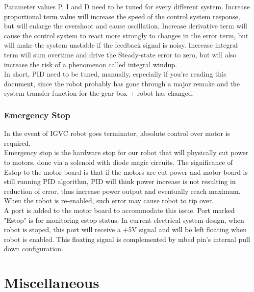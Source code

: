 \documentclass[letterpaper, 12pt]{article}
\begin{document}
Parameter values P, I and D need to be tuned for every different system. Increase proportional term value will increase the speed of the control system response, but will enlarge the overshoot and cause oscillation. Increase derivative term will cause the control system to react more strongly to changes in the error term, but will make the system unstable if the feedback signal is noisy. Increase integral term will sum overtime and drive the Steady-state error to zero, but will also increase the risk of a phenomenon called integral windup. \\

In short, PID need to be tuned, manually, especially if you're reading this document, since the robot probably has gone through a major remake and the system transfer function for the gear box + robot has changed.

\subsubsection{Emergency Stop}
In the event of IGVC robot goes terminator, absolute control over motor is required.\\

Emergency stop is the hardware stop for our robot that will physically cut power to motors, done via a solenoid with diode magic circuits. The significance of Estop to the motor board is that if the motors are cut power and motor board is still running PID algorithm, PID will think power increase is not resulting in reduction of error, thus increase power output and eventually reach maximum. When the robot is re-enabled, such error may cause robot to tip over. \\

A port is added to the motor board to accommodate this issue. Port marked "Estop" is for monitoring estop status. In current electrical system design, when robot is stoped, this port will receive a +5V signal and will be left floating when robot is enabled. This floating signal is complemented by mbed pin's internal pull down configuration. 

\section{Miscellaneous}
\end{document}
